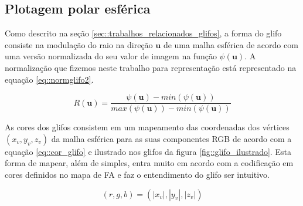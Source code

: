 \documentclass[
    12pt,                %
    oneside,            %
    a4paper,            %
    english,            %
    french,                %
    spanish,            %
    brazil                %
    ]{abntex2}
\begin{document}


\subsection{Plotagem polar esférica}

Como descrito na seção \ref{sec::trabalhos_relacionados_glifos}, a forma do glifo consiste na modulação do raio na direção $\mathbf{u}$ de uma malha esférica de acordo com uma versão normalizada do seu valor de imagem na função $\psi(\mathbf{u})$. A normalização que fizemos neste trabalho para representação está representado na equação \ref{eq::normglifo2}.

\begin{equation}
\label{eq::normglifo2}
    R(\mathbf{u}) = \frac{\psi(\mathbf{u}) - min(\psi(\mathbf{u}))}{max(\psi(\mathbf{u})) - min(\psi(\mathbf{u}))}
\end{equation}

As cores dos glifos consistem em um mapeamento das coordenadas dos vértices $(x_v,y_v,z_v)$ da malha esférica para as suas componentes RGB de acordo com a equação \ref{eq::cor_glifo} e ilustrado nos glifos da figura \ref{fig::glifo_ilustrado}. Esta forma de mapear, além de simples, entra muito em acordo com a codificação em cores definidos no mapa de FA e faz o entendimento do glifo ser intuitivo. %

\begin{equation}
\label{eq::cor_glifo}
    (r,g,b) = (|x_v|,|y_v|,|z_v|)
\end{equation}
\end{document}
